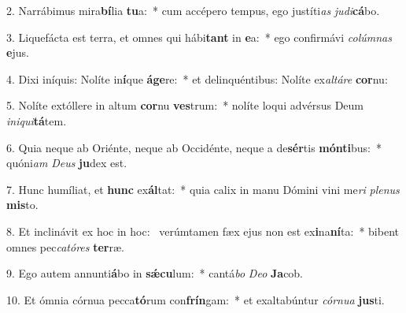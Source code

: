 2. Narrábimus mira\textbf{bí}lia \textbf{tu}a:~*  cum accépero tempus, ego justíti\textit{as} \textit{ju}\textit{di}\textbf{cá}bo.\

3. Liquefácta est terra, et omnes qui hábi\textbf{tant} in \textbf{e}a:~*  ego confirmávi \textit{co}\textit{lúm}\textit{nas} \textbf{e}jus.\

4. Dixi iníquis: Nolíte in\textbf{í}que \textbf{á}\textbf{ge}re:~*  et delinquéntibus: Nolíte ex\textit{al}\textit{tá}\textit{re} \textbf{cor}nu:\

5. Nolíte extóllere in altum \textbf{cor}nu \textbf{ves}trum:~*  nolíte loqui advérsus Deum \textit{in}\textit{i}\textit{qui}\textbf{tá}tem.\

6. Quia neque ab Oriénte, neque ab Occidénte, neque a de\textbf{sér}tis \textbf{món}\textbf{ti}bus:~*  quóni\textit{am} \textit{De}\textit{us} \textbf{ju}dex est.\

7. Hunc humíliat, et \textbf{hunc} ex\textbf{ál}tat:~*  quia calix in manu Dómini vini me\textit{ri} \textit{ple}\textit{nus} \textbf{mis}to.\

8. Et inclinávit ex hoc in hoc: \dag\  verúmtamen fæx ejus non est ex\textbf{i}na\textbf{ní}ta:~*  bibent omnes pec\textit{ca}\textit{tó}\textit{res} \textbf{ter}ræ.\

9. Ego autem annunti\textbf{á}bo in \textbf{sǽ}\textbf{cu}lum:~*  cantá\textit{bo} \textit{De}\textit{o} \textbf{Ja}cob.\

10. Et ómnia córnua pecca\textbf{tó}rum con\textbf{frín}gam:~*  et exaltabúntur \textit{cór}\textit{nu}\textit{a} \textbf{jus}ti.\

